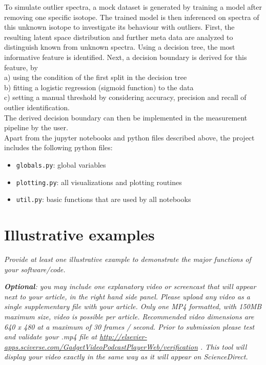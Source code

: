 \documentclass[preprint,12pt, a4paper]{elsarticle}
\begin{document}
To simulate outlier spectra, a mock dataset is generated by training a model after removing one specific isotope. The trained model is then inferenced on spectra of this unknown isotope to investigate its behaviour with outliers. 
First, the resulting latent space distribution and further meta data are analyzed to distinguish known from unknown spectra. Using a decision tree, the most informative feature is identified. 
Next, a decision boundary is derived for this feature, by  \\
a) using the condition of the first split in the decision tree \\
b) fitting a logistic regression (sigmoid function) to the data \\ 
c) setting a manual threshold by considering accuracy, precision and recall of outlier identification. \\
The derived decision boundary can then be implemented in the measurement pipeline by the user. \\


Apart from the jupyter notebooks and python files described above, the project includes the following python files:  
\begin{itemize}
\item \texttt{globals.py}: global variables  
\item \texttt{plotting.py}: all visualizations and plotting routines    
\item \texttt{util.py}: basic functions that are used by all notebooks  
\end{itemize}


\section{Illustrative examples}

\textit{Provide at least one illustrative example to demonstrate the major
functions of your software/code.}

\textit{\textbf{Optional}: you may include one explanatory  video or screencast that will appear next to your article, in the right hand side panel. Please upload any video as a single supplementary file with your article. Only one MP4 formatted, with 150MB maximum size, video is possible per article. Recommended video dimensions are 640 x 480 at a maximum of 30 frames / second. Prior to submission please test and validate your .mp4 file at  \url{http://elsevier-apps.sciverse.com/GadgetVideoPodcastPlayerWeb/verification} . This tool will display your video exactly in the same way as it will appear on ScienceDirect. }
\end{document}
